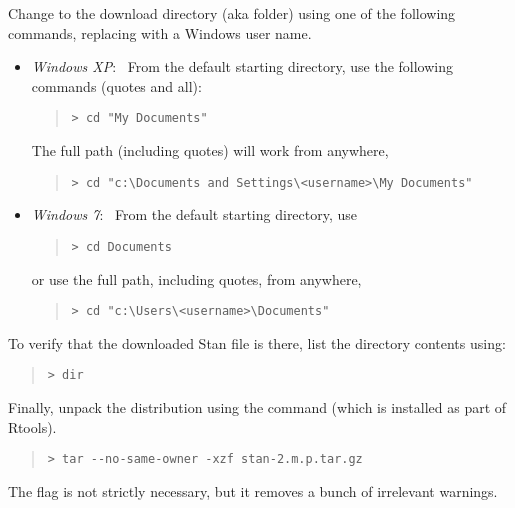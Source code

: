 Change to the download directory (aka folder) using one of the
following commands, replacing  with
a Windows user name.
%
\begin{itemize}
\item \emph{Windows XP}: \ From the default starting directory, use
the following commands (quotes and all):
\begin{quote}
\begin{Verbatim}[fontshape=sl,fontsize=\small]
> cd "My Documents"
\end{Verbatim}
\end{quote}
%
The full path (including quotes) will work from anywhere,
\begin{quote}
\begin{Verbatim}[fontshape=sl,fontsize=\small]
> cd "c:\Documents and Settings\<username>\My Documents"
\end{Verbatim}
\end{quote}
\item \emph{Windows 7}:  \  From the default starting directory, use
\begin{quote}
\begin{Verbatim}[fontshape=sl,fontsize=\small]
> cd Documents
\end{Verbatim}
\end{quote} 
or use the full path, including quotes, from anywhere,
\begin{quote}
\begin{Verbatim}[fontshape=sl,fontsize=\small]
> cd "c:\Users\<username>\Documents"
\end{Verbatim}
\end{quote}
\end{itemize}
%
To verify that the downloaded Stan  file is there,
list the directory contents using:
%
\begin{quote}
\begin{Verbatim}[fontshape=sl,fontsize=\small]
> dir
\end{Verbatim}
\end{quote}

Finally, unpack the distribution using the  command (which is
installed as part of Rtools).
%
\begin{quote}
\begin{Verbatim}[fontshape=sl,fontsize=\small]
> tar --no-same-owner -xzf stan-2.m.p.tar.gz 
\end{Verbatim}
\end{quote}
%
The  flag is not strictly necessary,
but it removes a bunch of irrelevant warnings.


